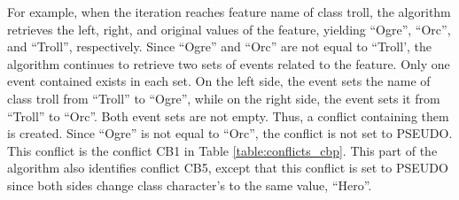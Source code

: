 For example, when the iteration reaches feature \textsf{name} of class \textsf{troll}, the algorithm retrieves the left, right, and original values of the feature, yielding “Ogre”, “Orc”, and “Troll”, respectively. Since “Ogre” and “Orc” are not equal to “Troll’, the algorithm continues to retrieve two sets of events related to the feature. Only one event contained exists in each set. On the left side, the event sets the name of class \textsf{troll} from “Troll” to “Ogre”, while on the right side, the event sets it from “Troll” to “Orc”. Both event sets are not empty. Thus, a conflict containing them is created. Since “Ogre” is not equal to “Orc”, the conflict is not set to \textsf{PSEUDO}. This conflict is the conflict \textsf{CB1} in Table \ref{table:conflicts_cbp}. This part of the algorithm also identifies conflict \textsf{CB5}, except that this conflict is set to \textsf{PSEUDO} since both sides change class \textsf{character}’s  to the same value, “Hero”.

